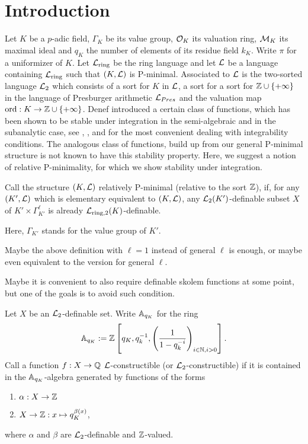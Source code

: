 \section{Introduction}


Let $K$ be a $p$-adic field, $\Gamma_K$ be its value group, $\cO_K$ its valuation ring, $\cM_K$ its maximal ideal and $q_K$ the number of elements of its residue field $k_K$. Write $\pi$ for a uniformizer of $K$. Let $\cL_{\rm ring}$ be the ring language and let $\cL$ be a language containing $\cL_{\rm ring}$ such that $(K,\cL)$ is P-minimal. Associated to $\cL$ is the two-sorted language $\cL_2$ which consists of a sort for $K$ in $\cL$, a sort for a sort for $\ZZ\cup\{+\infty\}$ in the language of Presburger arithmetic $\cL_{Pres}$ and the valuation map $\ord: K\to \ZZ\cup\{+\infty\}$. Denef introduced a certain class of functions, which has been shown to be stable under integration in the semi-algebraic and in the subanalytic case, see \cite{denef-2000}, \cite{Clu-2003}, and \cite{Clu-Gor-Hal-14} for the most convenient dealing with integrability conditions. The analogous class of functions, build up from our general P-minimal structure is not known to have this stability property. Here, we suggest a notion of relative P-minimality, for which we show stability under integration.

\begin{defn}

Call the structure $(K,\cL)$ relatively P-minimal (relative to the sort $\ZZ$), if, for any $(K',\cL)$ which is elementary equivalent to $(K,\cL)$, any $\cL_2(K')$-definable subset $X$ of $K'\times \Gamma_{K'}^\ell$ is already $\cL_{\rm ring, 2}(K)$-definable.

\end{defn}
Here, $\Gamma_{K'}$ stands for the value group of $K'$.

\begin{remark - ques}\label{rq1} Maybe the above definition with $\ell=1$ instead of general $\ell$ is enough, or maybe even equivalent to the version for general $\ell$. 
\end{remark - ques}


\begin{remark}\label{r1} Maybe it is convenient to also require definable skolem functions at some point, but one of the goals is to avoid such condition. 
\end{remark}


\begin{defn}
Let $X$ be an $\cL_2$-definable set. Write $\AA_{q_K}$ for the ring \[\AA_{q_K}:=\ZZ\left[q_K, q_k^{-1}, \left(\frac1{1-q_k^{-i}}\right)_{i\in \NN, i>0}\right].\]
Call a function $f:X\to \QQ$ $\cL$-constructible (or $\cL_2$-constructible) if it is contained in the $\AA_{q_K}$-algebra generated by functions of the forms
\begin{enumerate}
\item $\alpha:X\to \ZZ$
\item $X\to \ZZ:x\mapsto q_K^{\beta(x)}$,
\end{enumerate}
where $\alpha$ and $\beta$ are $\cL_2$-definable and $\ZZ$-valued.  
\end{defn}



